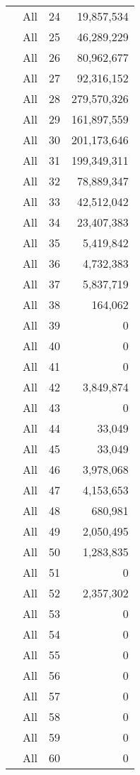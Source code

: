 \documentclass[]{article}
\begin{document}
\begin{longtable}{>{\em}l|l|r|r}
\cline{2-4}
 & All & 24 & 19,857,534\\
\cline{2-4}
\rowcolor{gray!6}   & All & 25 & 46,289,229\\
\cline{2-4}
 & All & 26 & 80,962,677\\
\cline{2-4}
\rowcolor{gray!6}   & All & 27 & 92,316,152\\
\cline{2-4}
 & All & 28 & 279,570,326\\
\cline{2-4}
\rowcolor{gray!6}   & All & 29 & 161,897,559\\
\cline{2-4}
 & All & 30 & 201,173,646\\
\cline{2-4}
\rowcolor{gray!6}   & All & 31 & 199,349,311\\
\cline{2-4}
 & All & 32 & 78,889,347\\
\cline{2-4}
\rowcolor{gray!6}   & All & 33 & 42,512,042\\
\cline{2-4}
 & All & 34 & 23,407,383\\
\cline{2-4}
\rowcolor{gray!6}   & All & 35 & 5,419,842\\
\cline{2-4}
 & All & 36 & 4,732,383\\
\cline{2-4}
\rowcolor{gray!6}   & All & 37 & 5,837,719\\
\cline{2-4}
 & All & 38 & 164,062\\
\cline{2-4}
\rowcolor{gray!6}   & All & 39 & 0\\
\cline{2-4}
 & All & 40 & 0\\
\cline{2-4}
\rowcolor{gray!6}   & All & 41 & 0\\
\cline{2-4}
 & All & 42 & 3,849,874\\
\cline{2-4}
\rowcolor{gray!6}   & All & 43 & 0\\
\cline{2-4}
 & All & 44 & 33,049\\
\cline{2-4}
\rowcolor{gray!6}   & All & 45 & 33,049\\
\cline{2-4}
 & All & 46 & 3,978,068\\
\cline{2-4}
\rowcolor{gray!6}   & All & 47 & 4,153,653\\
\cline{2-4}
 & All & 48 & 680,981\\
\cline{2-4}
\rowcolor{gray!6}   & All & 49 & 2,050,495\\
\cline{2-4}
 & All & 50 & 1,283,835\\
\cline{2-4}
\rowcolor{gray!6}   & All & 51 & 0\\
\cline{2-4}
 & All & 52 & 2,357,302\\
\cline{2-4}
\rowcolor{gray!6}   & All & 53 & 0\\
\cline{2-4}
 & All & 54 & 0\\
\cline{2-4}
\rowcolor{gray!6}   & All & 55 & 0\\
\cline{2-4}
 & All & 56 & 0\\
\cline{2-4}
\rowcolor{gray!6}   & All & 57 & 0\\
\cline{2-4}
 & All & 58 & 0\\
\cline{2-4}
\rowcolor{gray!6}   & All & 59 & 0\\
\cline{2-4}
\multirow{-60}{*}{\raggedright\arraybackslash Trachurus symmetricus} & All & 60 & 0\\
\hline
\end{longtable}
\end{document}
